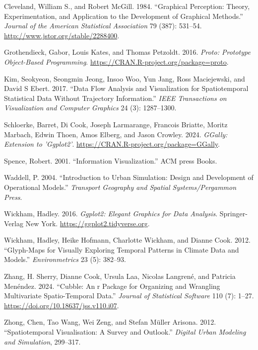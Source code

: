 \label{refs}
\begin{CSLReferences}{1}{0}
Cleveland, William S., and Robert McGill. 1984. {``Graphical Perception: Theory, Experimentation, and Application to the Development of Graphical Methods.''} \emph{Journal of the American Statistical Association} 79 (387): 531--54. \url{http://www.jstor.org/stable/2288400}.

Grothendieck, Gabor, Louis Kates, and Thomas Petzoldt. 2016. \emph{Proto: Prototype Object-Based Programming}. \url{https://CRAN.R-project.org/package=proto}.

Kim, Seokyeon, Seongmin Jeong, Insoo Woo, Yun Jang, Ross Maciejewski, and David S Ebert. 2017. {``Data Flow Analysis and Visualization for Spatiotemporal Statistical Data Without Trajectory Information.''} \emph{IEEE Transactions on Visualization and Computer Graphics} 24 (3): 1287--1300.

Schloerke, Barret, Di Cook, Joseph Larmarange, Francois Briatte, Moritz Marbach, Edwin Thoen, Amos Elberg, and Jason Crowley. 2024. \emph{GGally: Extension to 'Ggplot2'}. \url{https://CRAN.R-project.org/package=GGally}.

Spence, Robert. 2001. {``Information Visualization.''} ACM press Books.

Waddell, P. 2004. {``Introduction to Urban Simulation: Design and Development of Operational Models.''} \emph{Transport Geography and Spatial Systems/Pergammon Press}.

Wickham, Hadley. 2016. \emph{Ggplot2: Elegant Graphics for Data Analysis}. Springer-Verlag New York. \url{https://ggplot2.tidyverse.org}.

Wickham, Hadley, Heike Hofmann, Charlotte Wickham, and Dianne Cook. 2012. {``Glyph-Maps for Visually Exploring Temporal Patterns in Climate Data and Models.''} \emph{Environmetrics} 23 (5): 382--93.

Zhang, H. Sherry, Dianne Cook, Ursula Laa, Nicolas Langrené, and Patricia Menéndez. 2024. {``Cubble: An r Package for Organizing and Wrangling Multivariate Spatio-Temporal Data.''} \emph{Journal of Statistical Software} 110 (7): 1--27. \url{https://doi.org/10.18637/jss.v110.i07}.

Zhong, Chen, Tao Wang, Wei Zeng, and Stefan Müller Arisona. 2012. {``Spatiotemporal Visualisation: A Survey and Outlook.''} \emph{Digital Urban Modeling and Simulation}, 299--317.

\end{CSLReferences}


